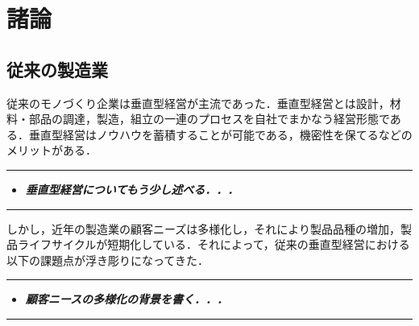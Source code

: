 \hypertarget{ux8af8ux8ad6}{%
\chapter{諸論}\label{ux8af8ux8ad6}}

\hypertarget{ux5f93ux6765ux306eux88fdux9020ux696d}{%
\section{従来の製造業}\label{ux5f93ux6765ux306eux88fdux9020ux696d}}

従来のモノづくり企業は垂直型経営が主流であった\cite{Suichoku}．垂直型経営とは設計，材料・部品の調達，製造，組立の一連のプロセスを自社でまかなう経営形態である．垂直型経営はノウハウを蓄積することが可能である，機密性を保てるなどのメリットがある．

\begin{center}\rule{0.5\linewidth}{0.5pt}\end{center}

\begin{itemize}
\tightlist
\item
  \textbf{\emph{垂直型経営についてもう少し述べる．．．}}
\end{itemize}

\begin{center}\rule{0.5\linewidth}{0.5pt}\end{center}

しかし，近年の製造業の顧客ニーズは多様化し，それにより製品品種の増加，製品ライフサイクルが短期化している．それによって，従来の垂直型経営における以下の課題点が浮き彫りになってきた．

\begin{center}\rule{0.5\linewidth}{0.5pt}\end{center}

\begin{itemize}
\tightlist
\item
  \textbf{\emph{顧客ニースの多様化の背景を書く．．．}}
\end{itemize}

\begin{center}\rule{0.5\linewidth}{0.5pt}\end{center}


